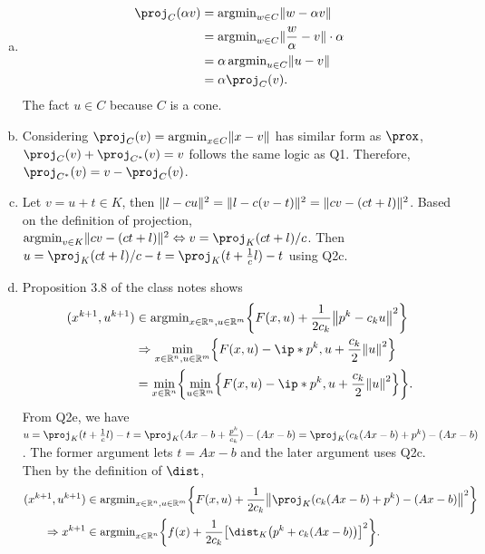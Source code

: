 \documentclass{article}
\begin{document}
\begin{solution}
\begin{enumerate}[(a)]
{\begin{proof}
                The two directions are proved.
            \end{proof}
        }
        \item {
            \begin{align*}
                \proj_C(\alpha v)
                &= \argmin_{w\in C}\norm{w-\alpha v} \\
                &= \argmin_{w\in C}\norm{\frac{w}{\alpha}-v}\cdot \alpha \\
                &= \alpha \argmin_{u\in C}\norm{u-v} \\
                &= \alpha \proj_C(v).
            \end{align*}
            The fact $u\in C$ because $C$ is a cone.
        }
        \item {
            Considering $\proj_C(v)=\argmin_{x\in C}\norm{x-v}$ has similar form as $\prox$, $\proj_C(v)+\proj_{C^*}(v)=v$ follows the same logic as Q1. Therefore, $\proj_{C^*}(v)=v-\proj_C(v)$.
        }
        \item {
            Let $v=u+t\in K$, then $\lVert l-cu\rVert^2=\lVert l-c(v-t)\rVert^2=\lVert cv-(ct+l)\rVert^2$. Based on the definition of projection, $\argmin_{v\in K}\norm{cv-(ct+l)}^2 \Leftrightarrow v=\proj_{K}(ct+l)/c$. Then $u=\proj_{K}(ct+l)/c-t=\proj_{K}(t+\frac{1}{c}l)-t$ using Q2c.
        }
        \item {
            Proposition 3.8 of the class notes shows
            \begin{align*}
                (x^{k+1}, u^{k+1})
                &\in\argmin_{x\in\R^n, u\in\R^m}\braces*{F(x, u)+\frac{1}{2c_k}\norm*{p^k-c_ku}^2} \\
                &\Rightarrow \min_{x\in\R^n, u\in\R^m}\braces*{F(x,u)-\ip*{p^k, u}+\frac{c_k}{2}\norm*{u}^2} \\
                &= \min_{x\in\R^n}\braces*{\min_{u\in\R^m}\braces*{F(x,u)-\ip*{p^k, u}+\frac{c_k}{2}\norm*{u}^2}}.
            \end{align*}
            From Q2e, we have $u=\proj_{K}(t+\frac{1}{c}l)-t=\proj_{K}(Ax-b+\frac{p^k}{c_k})-(Ax-b)=\proj_{K}(c_k(Ax-b)+p^k)-(Ax-b)$. The former argument lets $t=Ax-b$ and the later argument uses Q2c. Then by the definition of $\dist$,
            \begin{align*}
                (x^{k+1}, u^{k+1})
                &\in\argmin_{x\in\R^n, u\in\R^m}\braces*{F(x, u)+\frac{1}{2c_k}\norm*{\proj_{K}(c_k(Ax-b)+p^k)-(Ax-b)}^2} \\
                \Rightarrow x^{k+1} & \in \argmin_{x\in\R^n} \braces*{f(x) + \frac{1}{2c_k}\bracks*{\dist_K\parens*{p^k+c_k\parens*{Ax-b}}}^2}.

\end{align*}}
\end{enumerate}
\end{solution}
\end{document}
